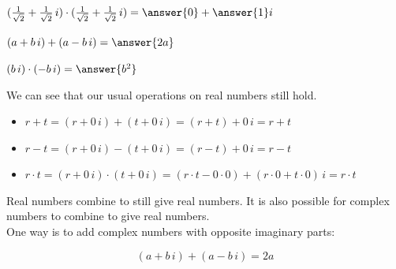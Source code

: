 \documentclass{ximera}
\begin{document}
\begin{question}


\item   $(\frac{1}{\sqrt{2}} +  \frac{1}{\sqrt{2}} \, i) \cdot (\frac{1}{\sqrt{2}} + \frac{1}{\sqrt{2}} \, i) = \answer{0} + \answer{1} i$


\end{question}










\begin{question}


\item   $(a +  b \, i) + (a - b \, i) = \answer{2a}$


\end{question}






\begin{question}


\item   $(b \, i) \cdot  (-b \, i) = \answer{b^2}$


\end{question}






We can see that our usual operations on real numbers still hold.

\begin{itemize}
\item $r + t = (r + 0 \, i) + (t + 0 \, i) = (r + t) + 0 \, i = r + t$ \\ 
\item $r - t = (r + 0 \, i) - (t + 0 \, i) = (r - t) + 0 \, i = r - t$ \\ 
\item $r \cdot t = (r + 0 \, i) \cdot (t + 0 \, i) = (r \cdot t - 0 \cdot 0) + (r \cdot 0 + t \cdot 0) \, i = r \cdot t$ \\ 
\end{itemize}


Real numbers combine to still give real numbers.  It is also possible for complex numbers to combine to give real numbers. \\


One way is to add complex numbers with opposite imaginary parts:

\[
(a + b \, i) + (a - b \, i) = 2a
\]
\end{document}
